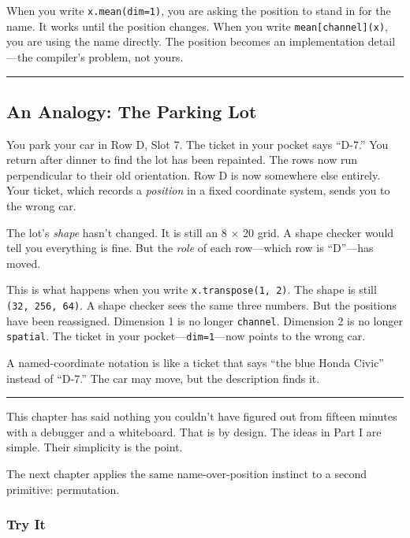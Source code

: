 \documentclass[11pt,]{article}
\begin{document}
When you write \texttt{x.mean(dim=1)}, you are asking the position to
stand in for the name. It works until the position changes. When you
write \texttt{mean{[}channel{]}(x)}, you are using the name directly.
The position becomes an implementation detail---the compiler's problem,
not yours.

\begin{center}\rule{0.5\linewidth}{0.4pt}\end{center}

\hypertarget{an-analogy-the-parking-lot}{%
\subsection{An Analogy: The Parking
Lot}\label{an-analogy-the-parking-lot}}

You park your car in Row D, Slot 7. The ticket in your pocket says
``D-7.'' You return after dinner to find the lot has been repainted. The
rows now run perpendicular to their old orientation. Row D is now
somewhere else entirely. Your ticket, which records a \emph{position} in
a fixed coordinate system, sends you to the wrong car.

The lot's \emph{shape} hasn't changed. It is still an 8 × 20 grid. A
shape checker would tell you everything is fine. But the \emph{role} of
each row---which row is ``D''---has moved.

This is what happens when you write \texttt{x.transpose(1,\ 2)}. The
shape is still \texttt{(32,\ 256,\ 64)}. A shape checker sees the same
three numbers. But the positions have been reassigned. Dimension 1 is no
longer \texttt{channel}. Dimension 2 is no longer \texttt{spatial}. The
ticket in your pocket---\texttt{dim=1}---now points to the wrong car.

A named-coordinate notation is like a ticket that says ``the blue Honda
Civic'' instead of ``D-7.'' The car may move, but the description finds
it.

\begin{center}\rule{0.5\linewidth}{0.4pt}\end{center}

This chapter has said nothing you couldn't have figured out from fifteen
minutes with a debugger and a whiteboard. That is by design. The ideas
in Part I are simple. Their simplicity is the point.

The next chapter applies the same name-over-position instinct to a
second primitive: permutation.

\hypertarget{try-it}{%
\subsubsection{Try It}\label{try-it}}
\end{document}
